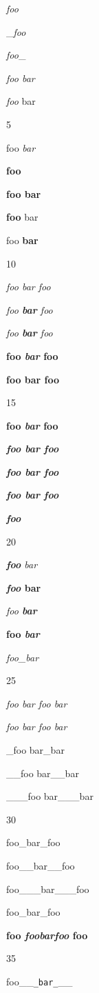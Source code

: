 \emph{foo}

_\emph{foo}

\emph{foo}_

\emph{foo bar}

\emph{foo} bar

5

foo \emph{bar}

\textbf{foo}

\textbf{foo bar}

\textbf{foo} bar

foo \textbf{bar}

10

\emph{foo \emph{bar} foo}

\emph{foo \textbf{bar} foo}

\emph{foo \textbf{\emph{bar}} foo}

\textbf{foo \emph{bar} foo}

\textbf{foo \textbf{bar} foo}

15

\textbf{foo \textbf{\emph{bar}} foo}

\textbf{\emph{foo \emph{bar} foo}}

\textbf{\emph{foo \textbf{bar} foo}}

\textbf{\emph{foo \textbf{\emph{bar}} foo}}

\textbf{\emph{foo}}

20

\emph{\textbf{foo} bar}

\textbf{\emph{foo} bar}

\emph{foo \textbf{bar}}

\textbf{foo \emph{bar}}

\emph{foo_bar}

25

\emph{foo \emph{bar \emph{foo \emph{bar}}}}

\emph{\emph{\emph{\emph{foo} bar} foo} bar}

_foo bar_bar

__foo bar__bar

___foo bar___bar

30

foo_bar_foo

foo__bar__foo

foo___bar___foo

foo_bar_foo

\textbf{foo \emph{foobarfoo} foo}

35

foo__\texttt{_bar_}__

